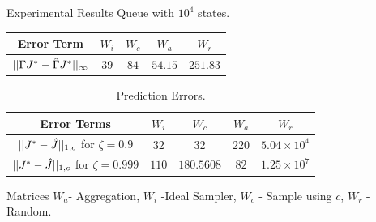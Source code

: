 \documentclass[10pt,handout]{beamer}
\begin{document}
\begin{frame}[fragile]{Experimental Results}
Queue with $10^4$ states.
\begin{table}
\begin{tabular}{|c|c|c|c|c|}\hline
Error Term&     $W_i$&  $W_c$& $W_a$& $W_r$ \\\hline
$||\Gamma J^*-\hat{\Gamma} J^*||_\infty$ & $39$    &$84$& $54.15$& $251.83$ \\\hline
\end{tabular}
\end{table}

\begin{table}
\begin{center}
\begin{tabular}{|c|c|c|c|c|}\hline
Error Terms&    $W_i$&  $W_c$& $W_a$& $W_r$ \\\hline
$||J^*-\hat{J}||_{1,c}$ for $\zeta=0.9$& $32$&      $32$& $220$& $5.04\times 10^4$ \\\hline
$||J^*-\hat{J}||_{1,c}$ for $\zeta=0.999$& $110$&   $180.5608$& $82$& $1.25\times 10^7$ \\\hline
\end{tabular}
\end{center}
\caption*{Prediction Errors.}
\label{perf1}
\end{table}
\begin{block}{Matrices}
$W_a$- Aggregation, $W_i$ -Ideal Sampler, $W_c$ - Sample using $c$, $W_r$ - Random.
\end{block}
\end{frame}
\end{document}
